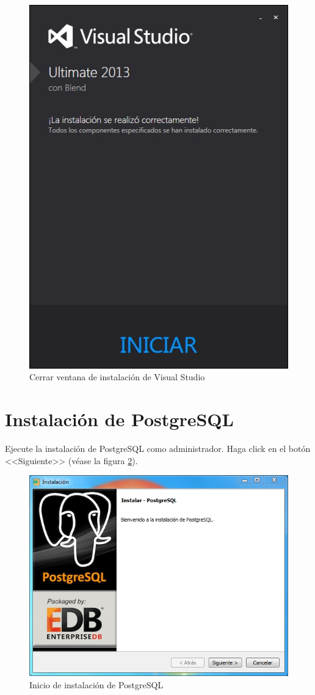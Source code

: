 \begin{figure}[H]
  \centering
  \includegraphics[width=.8\linewidth]{./img/vs-instalacion4.jpg}
\caption[]{Cerrar ventana de instalaci\'{o}n de Visual Studio\label{fig:vs-instalacion4}}
\end{figure}

\newpage

\section*{Instalaci\'{o}n de PostgreSQL}
	
Ejecute la instalaci\'{o}n de PostgreSQL como administrador. Haga click en el bot\'{o}n <<Siguiente>> (v\'{e}ase la figura \ref{fig:postgres1}).

\begin{figure}[H]
  \centering
  \includegraphics[width=.6\linewidth]{./img/postgres1.jpg}
\caption[]{Inicio de instalaci\'{o}n de PostgreSQL\label{fig:postgres1}}
\end{figure}

